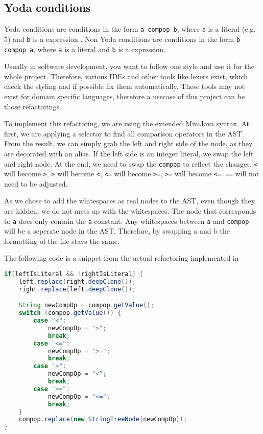 
\subsection{Yoda conditions}

Yoda conditions are conditions in the form \verb|a compop b|, where \verb|a| is a literal (e.g. 5) and \verb|b| is a expression \cite[page 71]{readable_code}.
Non Yoda conditions are conditions in the form \verb|b compop a|, where \verb|a| is a literal and \verb|b| is a expression.

Usually in software development, you want to follow one style and use it for the whole project. 
Therefore, various IDEs and other tools like lexers exist, which check
the styling and if possible fix them automatically. These tools may not exist for domain specific languages, 
therefore a usecase of this project can be those refactorings.

To implement this refactoring, we are using the extended MiniJava syntax. 
At first, we are applying a selector to find all comparison operators in the AST.
From the result, we can simply grab the left and right side of the node, as they are decorated with an alias. 
If the left side is an integer literal, we swap the left and right node.
At the end, we need to swap the \verb|compop| to reflect the changes. 
\verb|<| will become \verb|>|, \verb|>| will become \verb|<|, \verb|<=| will become \verb|>=|, \verb|>=| will become \verb|<=|.
\verb|==| will not need to be adjusted.

As we chose to add the whitespaces as real nodes to the AST, even though they are hidden, we do not mess up with the whitespaces.
The node that corresponds to \verb|a| does only contain the \verb|a| constant. 
Any whitespaces between \verb|a| and \verb|compop| will be a seperate node in the AST. Therefore, by swapping a and b the formatting
of the file stays the same.

The following code is a snippet from the actual refactoring implemented in \cite{yoda_refactoring}

\begin{lstlisting}[language=Java, caption=Refactor Yoda conditions]
if(leftIsLiteral && !rightIsLiteral) {
    left.replace(right.deepClone());
    right.replace(left.deepClone());

    String newCompOp = compop.getValue();
    switch (compop.getValue()) {
        case "<":
            newCompOp = ">";
            break;
        case "<=":
            newCompOp = ">=";
            break;
        case ">":
            newCompOp = "<";
            break;
        case ">=":
            newCompOp = "<=";
            break;
    }
    compop.replace(new StringTreeNode(newCompOp));
}
\end{lstlisting}
